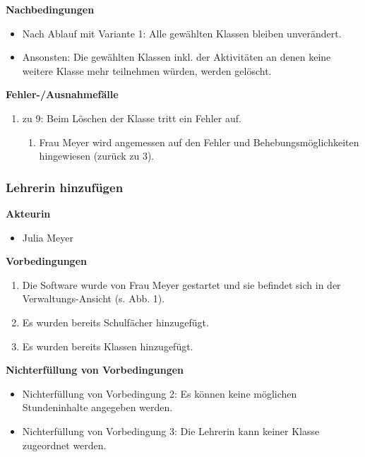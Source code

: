 \documentclass[fontsize=12pt,paper=a4,twoside]{scrartcl}
\begin{document}
\textbf{Nachbedingungen}
\begin{itemize}
\item Nach Ablauf mit Variante 1: Alle gewählten Klassen bleiben unverändert.
\item Ansonsten: Die gewählten Klassen inkl. der Aktivitäten an denen keine weitere Klasse mehr teilnehmen würden, werden gelöscht. 
\end{itemize}
\vspace{5pt}

\textbf{Fehler-/Ausnahmefälle}
\begin{enumerate}
\item zu 9: Beim Löschen der Klasse tritt ein Fehler auf.
	\begin{enumerate}[label=\arabic*.]
	\item Frau Meyer wird angemessen auf den Fehler und Behebungsmöglichkeiten hingewiesen (zurück zu 3).
	\end{enumerate}
\end{enumerate}


\subsubsection{Lehrerin hinzufügen}
\label{subsubsec:LehrerinHinzufuegen}
\textbf{Akteurin}
\begin{itemize}
\item Julia Meyer
\end{itemize}
\vspace{5pt}


\textbf{Vorbedingungen}
\begin{enumerate}
\item Die Software wurde von Frau Meyer gestartet und sie befindet sich in der Verwaltungs-Ansicht (s. Abb. 1).
\item Es wurden bereits Schulfächer hinzugefügt.
\item Es wurden bereits Klassen hinzugefügt.
\end{enumerate}
\vspace{5pt}

\textbf{Nichterfüllung von Vorbedingungen}
\begin{itemize}
\item Nichterfüllung von Vorbedingung 2: Es können keine möglichen Stundeninhalte angegeben werden.
\item Nichterfüllung von Vorbedingung 3: Die Lehrerin kann keiner Klasse zugeordnet werden.
\end{itemize}
\vspace{5pt}
\end{document}
